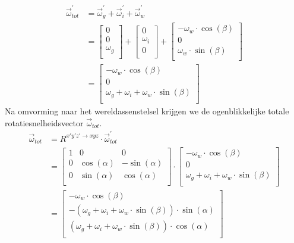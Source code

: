\begin{equation}
\begin{split}
\vec{\omega}_{tot}^{'}&=\vec{\omega}_{g}^{'} + \vec{\omega}_{i}^{'} + \vec{\omega}_{w}^{'}\\
&=\begin{bmatrix}
0						\\
0						\\
\omega_{g}	\\
\end{bmatrix}
+\begin{bmatrix}
0						\\
\omega_{i}	\\
0						\\
\end{bmatrix}
+\begin{bmatrix}
-\omega_{w}\cdot \cos(\beta)	\\
0						\\
\omega_{w}\cdot \sin(\beta)	\\
\end{bmatrix}\\
&=\begin{bmatrix}
-\omega_{w}\cdot \cos(\beta)	\\
0						\\
\omega_{g}+\omega_{i}+\omega_{w}\cdot \sin(\beta)	\\
\end{bmatrix}
\end{split}
\label{eq:kin1.2}
\end{equation}
Na omvorming naar het wereldassenstelsel krijgen we de ogenblikkelijke totale rotatiesnelheidsvector $\vec{\omega}_{tot}$.
\begin{equation}
\begin{split}
\vec{\omega}_{tot}&=R^{x'y'z' \rightarrow xyz} \cdot \vec{\omega}_{tot}^{'}\\
&=\begin{bmatrix}
1			&			0			&			0		   \\
0			&\cos(\alpha)&-\sin(\alpha)\\
0			&\sin(\alpha)&\cos(\alpha) \\
\end{bmatrix}
\cdot
\begin{bmatrix}
-\omega_{w}\cdot \cos(\beta)	\\
0						\\
\omega_{g}+\omega_{i}+\omega_{w}\cdot \sin(\beta)	\\
\end{bmatrix}\\
&=
\begin{bmatrix}
-\omega_{w}\cdot \cos(\beta)	\\
-(\omega_{g}+\omega_{i}+\omega_{w}\cdot \sin(\beta))	\cdot \sin(\alpha)			\\
(\omega_{g}+\omega_{i}+\omega_{w}\cdot \sin(\beta))	\cdot \cos(\alpha)	\\
\end{bmatrix}
\end{split}
\label{eq:kin1.3}
\end{equation}
\newpage
